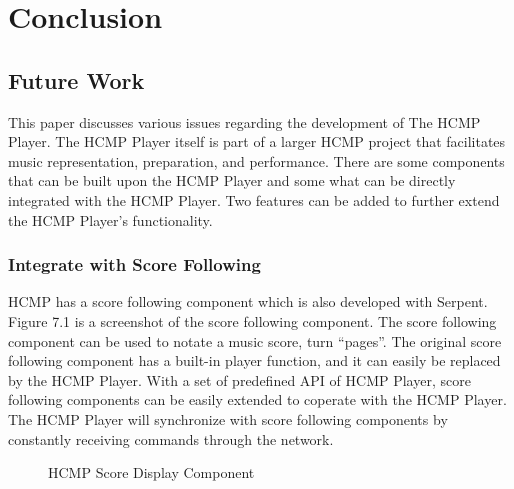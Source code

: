 
\chapter{Conclusion} %



\ifpdf
    \graphicspath{{X/figures/PNG/}{X/figures/PDF/}{X/figures/}}
\else
    \graphicspath{{X/figures/EPS/}{X/figures/}}
\fi


\section{Future Work}

This paper discusses various issues regarding the development of 
The HCMP Player. The HCMP Player itself is part of a larger HCMP project 
that facilitates music representation, preparation, and performance.
There are some components that can be built upon the HCMP Player and some 
what can be directly integrated with the HCMP Player. Two
features can be added to further extend the HCMP Player's functionality. 

\subsection{Integrate with Score Following}
HCMP has a score following component which is also developed with Serpent.
Figure 7.1 is a screenshot of the score following component. The score 
following component can be used to notate a music score, turn
``pages''. The original score following component has a built-in player function,
and it can easily be replaced by the HCMP Player. With a set of predefined API 
of HCMP Player, score following components can be easily extended to coperate with 
the HCMP Player. The HCMP Player will synchronize with score following components 
by constantly receiving commands through the network. 

\begin{figure}[H]
\caption{HCMP Score Display Component}
\label{fig:speciation}
\end{figure}

